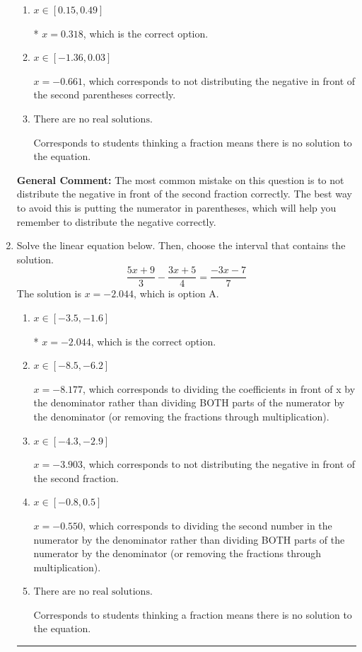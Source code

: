 \documentclass{extbook}[14pt]
\newcommand{\litem}[1]{\item #1

\rule{\textwidth}{0.4pt}}
\begin{document}
\begin{enumerate}
{\begin{enumerate}[label=\Alph*.]
$x = 0.661$, which corresponds to not distributing the negative in front of the first parentheses correctly.
\item \( x \in [0.15, 0.49] \)

* $x = 0.318$, which is the correct option.
\item \( x \in [-1.36, 0.03] \)

$x = -0.661$, which corresponds to not distributing the negative in front of the second parentheses correctly.
\item \( \text{There are no real solutions.} \)

Corresponds to students thinking a fraction means there is no solution to the equation.
\end{enumerate}

\textbf{General Comment:} The most common mistake on this question is to not distribute the negative in front of the second fraction correctly. The best way to avoid this is putting the numerator in parentheses, which will help you remember to distribute the negative correctly.
}
\litem{
Solve the linear equation below. Then, choose the interval that contains the solution.
\[ \frac{5x + 9}{3} - \frac{3x + 5}{4} = \frac{-3x -7}{7} \]The solution is \( x = -2.044 \), which is option A.\begin{enumerate}[label=\Alph*.]
\item \( x \in [-3.5, -1.6] \)

* $x = -2.044$, which is the correct option.
\item \( x \in [-8.5, -6.2] \)

 $x = -8.177$, which corresponds to dividing the coefficients in front of x by the denominator rather than dividing BOTH parts of the numerator by the denominator (or removing the fractions through multiplication).
\item \( x \in [-4.3, -2.9] \)

 $x = -3.903$, which corresponds to not distributing the negative in front of the second fraction.
\item \( x \in [-0.8, 0.5] \)

 $x = -0.550$, which corresponds to dividing the second number in the numerator by the denominator rather than dividing BOTH parts of the numerator by the denominator (or removing the fractions through multiplication).
\item \( \text{There are no real solutions.} \)

Corresponds to students thinking a fraction means there is no solution to the equation.
\end{enumerate}

}
\end{enumerate}
\end{document}
